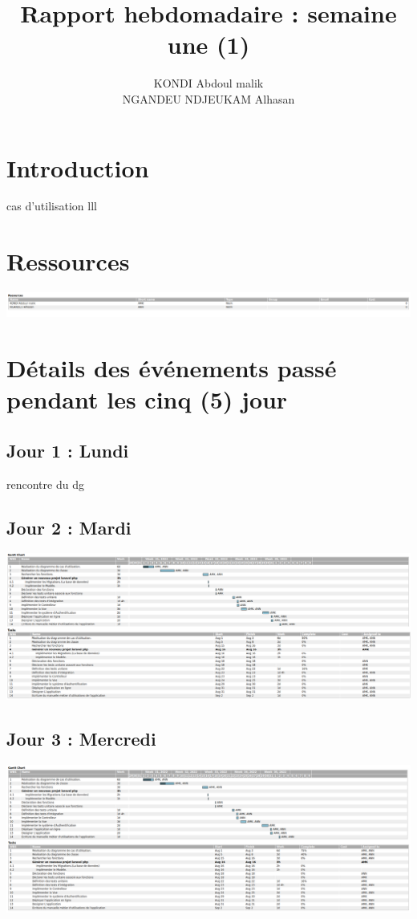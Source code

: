 \documentclass[12pt,a4paper]{article}
\author{KONDI Abdoul malik \\ NGANDEU NDJEUKAM Alhasan}
\title{Rapport hebdomadaire : semaine une (1)}
\begin{document}
\maketitle
\tableofcontents
\newpage

\section{Introduction}
	cas d'utilisation
	lll
\section{Ressources}
\includegraphics[scale=0.25]{images/resources.png}
\section{Détails des événements passé pendant les cinq (5) jour}
\subsection{Jour 1 : Lundi}
rencontre du dg 
\subsection{Jour 2 : Mardi}
\includegraphics[scale=0.23]{images/jour2.png}
\subsection{Jour 3 : Mercredi}
\includegraphics[scale=0.23]{images/jour3.png}
\end{document}
